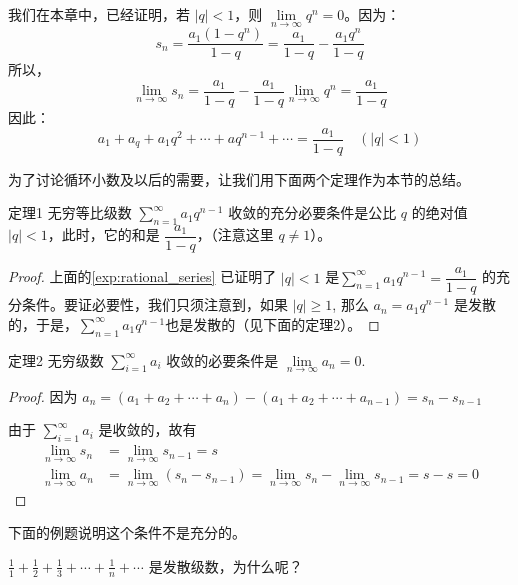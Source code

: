 \begin{solution}
    我们在本章中，已经证明，若 $|q|<1$，则 $\lim\limits_{n\to\infty}q^n=0$。因为：
\[s_n=\frac{a_1(1-q^n)}{1-q}=\frac{a_1}{1-q}-\frac{a_1q^n}{1-q}\]
所以，
\[\lim_{n\to\infty}s_n=\frac{a_1}{1-q}-\frac{a_1}{1-q}\lim_{n\to\infty}q^n=\frac{a_1}{1-q}\]
因此：\[a_1+a_q+a_1q^2+\cdots +aq^{n-1}+\cdots=\frac{a_1}{1-q} \quad (|q|<1)\]
\end{solution}

为了讨论循环小数及以后的需要，让我们用下面两个定理作为本节的总结。

\begin{Theorem}{定理1}
    无穷等比级数 $\sum\limits^{\infty}_{n=1}a_1q^{n-1}$ 收敛的充分必要条件是公比 $q$ 的绝对值 $|q|<1$，此时，它的和是 $\dfrac{a_1}{1-q}$，（注意这里 $q\neq 1$）。
\end{Theorem}

\begin{proof}
  上面的\cref{exp:rational_series} 已证明了 $|q|<1$ 是$\sum\limits^{\infty}_{n=1}a_1q^{n-1}=\dfrac{a_1}{1-q}$
的充分条件。要证必要性，我们只须注意到，如果 $|q|\geqslant 1$, 
那么 $a_n=a_1q^{n-1}$ 是发散的，于是，$\sum\limits^{\infty}_{n=1}a_1q^{n-1}$也是发散的（见下面的定理2）。
\end{proof}

\begin{Theorem}{定理2}
无穷级数 $\sum\limits^{\infty}_{i=1}a_i$ 收敛的必要条件是 $\lim\limits_{n\to \infty}a_n=0$.
\end{Theorem}

\begin{proof}
因为 $a_n=(a_1+a_2+\cdots +a_n)-(a_1+a_2+\cdots +a_{n-1})
=s_n-s_{n-1}$

由于 $\sum\limits^{\infty}_{i=1}a_i$ 是收敛的，故有
\[\begin{split}
    \lim_{n\to\infty}s_n&=\lim_{n\to\infty}s_{n-1}=s\\
    \lim_{n\to\infty}a_n&=\lim_{n\to\infty}(s_n-s_{n-1})=\lim_{n\to\infty}s_n-\lim_{n\to\infty}s_{n-1}=s-s=0
\end{split}\]
\end{proof}

下面的例题说明这个条件不是充分的。


\begin{example}
  $\displaystyle\frac{1}{1}+\frac{1}{2}+\frac{1}{3}+\cdots +\frac{1}{n}+\cdots$ 是发散级数，为什么呢？
\end{example}

